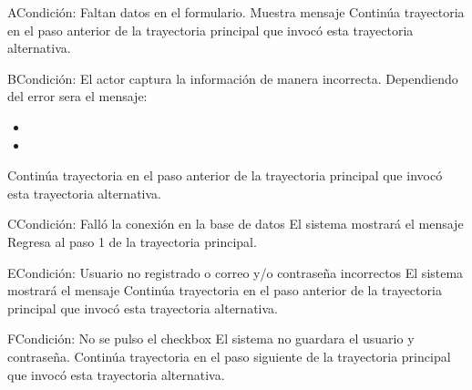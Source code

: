 	\begin{UCtrayectoriaA}{A}{Condición: Faltan datos en el formulario.}
		\UCpaso[\UCsist] Muestra mensaje 
		\UCpaso[\UCsist] Continúa trayectoria en el paso anterior de la trayectoria  principal que invocó esta trayectoria alternativa. 
	\end{UCtrayectoriaA}
	\begin{UCtrayectoriaA}{B}{Condición: El actor captura la información de manera incorrecta.}
		\UCpaso[\UCsist] Dependiendo del error sera el mensaje:
			\begin{itemize}
			\item {}
			\item {}
			\end{itemize}
		\UCpaso[\UCsist] Continúa trayectoria en el paso anterior de la trayectoria principal que invocó esta trayectoria alternativa. 
	\end{UCtrayectoriaA}
	\begin{UCtrayectoriaA}{C}{Condición: Falló la conexión en la base de datos}
		\UCpaso[\UCsist] El sistema mostrará el mensaje 
		\UCpaso[\UCsist] Regresa al paso 1 de la trayectoria principal. 
	\end{UCtrayectoriaA}
	\begin{UCtrayectoriaA}{E}{Condición: Usuario no registrado o correo y/o contraseña incorrectos}
		\UCpaso[\UCsist] El sistema mostrará el mensaje 
		\UCpaso[\UCsist] Continúa trayectoria en el paso anterior de la trayectoria principal que invocó esta trayectoria alternativa. 
	\end{UCtrayectoriaA}
	\begin{UCtrayectoriaA}{F}{Condición: No se pulso el checkbox}
		\UCpaso[\UCsist] El sistema no guardara el usuario y contraseña.
		\UCpaso[\UCsist] Continúa trayectoria en el paso siguiente de la trayectoria principal que invocó esta trayectoria alternativa. 
	\end{UCtrayectoriaA}
